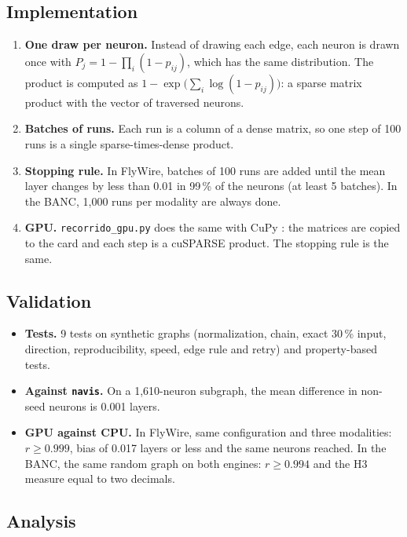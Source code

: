 \documentclass[11pt,letterpaper]{article}
\begin{document}
\subsection{Implementation}

\begin{enumerate}
  \item \textbf{One draw per neuron.} Instead of drawing each edge, each neuron is drawn once with $P_j = 1-\prod_i(1-p_{ij})$, which has the same distribution. The product is computed as $1-\exp\!\big(\sum_i \log(1-p_{ij})\big)$: a sparse matrix product with the vector of traversed neurons.
  \item \textbf{Batches of runs.} Each run is a column of a dense matrix, so one step of 100 runs is a single sparse-times-dense product.
  \item \textbf{Stopping rule.} In FlyWire, batches of 100 runs are added until the mean layer changes by less than 0.01 in 99\,\% of the neurons (at least 5 batches). In the BANC, 1{,}000 runs per modality are always done.
  \item \textbf{GPU.} \texttt{recorrido\_gpu.py} does the same with CuPy \citep{cupy}: the matrices are copied to the card and each step is a cuSPARSE product. The stopping rule is the same.
\end{enumerate}

\subsection{Validation}

\begin{itemize}
  \item \textbf{Tests.} 9 tests on synthetic graphs (normalization, chain, exact 30\,\% input, direction, reproducibility, speed, edge rule and retry) and property-based tests.
  \item \textbf{Against \texttt{navis}.} On a 1{,}610-neuron subgraph, the mean difference in non-seed neurons is 0.001 layers.
  \item \textbf{GPU against CPU.} In FlyWire, same configuration and three modalities: $r \ge 0.999$, bias of 0.017 layers or less and the same neurons reached. In the BANC, the same random graph on both engines: $r \ge 0.994$ and the H3 measure equal to two decimals.
\end{itemize}

\subsection{Analysis}
\end{document}
